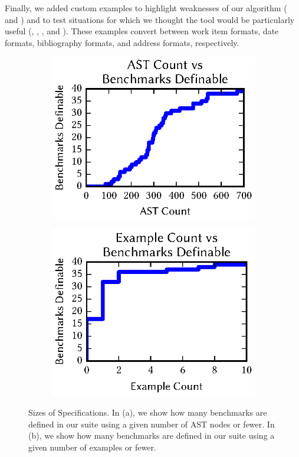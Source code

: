 \documentclass[12pt]{article}
\begin{document}
{Finally, we added custom examples to highlight weaknesses of
our algorithm ( and ) 
and to test situations for which we thought the tool would be
particularly useful (, , ,
and ).   These examples convert between work item formats, date
formats, bibliography formats, and address formats, respectively.

\begin{figure}
  \centering
  \begin{subfigure}[b]{.49\textwidth}
    \centering
    \includegraphics{figs/specsizes}
    \caption{}
    \label{subfig:lenssize}
  \end{subfigure}
  \begin{subfigure}[b]{.49\textwidth}
    \includegraphics{figs/examplesused}
    \caption{}
    \label{subfig:examplesused}
  \end{subfigure}
  \caption{Sizes of Specifications.
    In (a), we show how many benchmarks are defined in our suite using a
    given number of AST nodes or fewer.
    In (b), we show how many benchmarks are defined in our suite using a
    given number of examples or fewer.}
  \label{fig:definition-sizes}
\end{figure}

}
\end{document}
